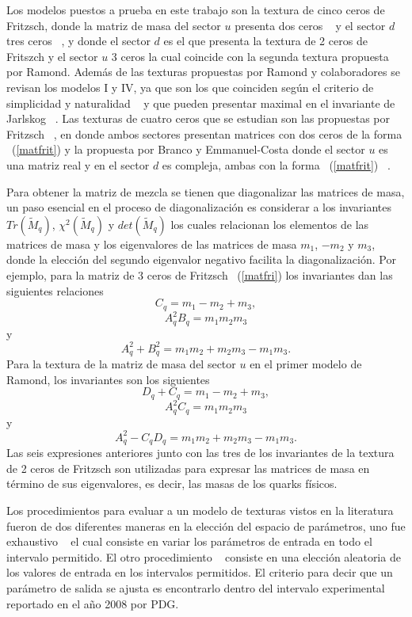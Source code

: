 
Los modelos puestos a prueba en este trabajo son la textura de cinco ceros de 
Fritzsch, donde la matriz de masa del sector $u$ presenta dos ceros 
~\cite{Mah200901} y el sector $d$ tres ceros ~\cite{Mah200901}, y donde el 
sector $d$ es el que presenta la textura de 2 ceros de Fritszch y el sector $u$ 3 ceros la cual coincide con la segunda
textura propuesta por Ramond. Adem\'as de las texturas propuestas por Ramond y 
colaboradores se revisan los modelos I y IV, ya que son los que coinciden 
seg\'un el criterio de simplicidad y naturalidad ~\cite{Fri200001} y que pueden 
presentar maximal en el invariante de Jarlskog ~\cite{Rod200101}. Las texturas 
de cuatro ceros que se estudian son las propuestas por Fritzsch 
~\cite{Fri200201}, en donde ambos sectores presentan matrices con dos ceros de 
la forma ~(\ref{matfrit}) y la propuesta por Branco y Emmanuel-Costa donde el 
sector $u$ es una matriz real y en el sector $d$ es compleja, ambas con la forma
~(\ref{matfrit}) ~\cite{Bra199902}. 

Para obtener la matriz de mezcla se tienen que diagonalizar las matrices de 
masa, un paso esencial en el proceso de diagonalizaci\'on es considerar a los 
invariantes $Tr(\tilde M_q)$, $\chi^2(\tilde M_q)$ y $det(\tilde M_q)$ los 
cuales relacionan los elementos de las matrices de masa y los eigenvalores de 
las matrices de masa $m_1$, $-m_2$ y $m_3$, donde la elecci\'on del segundo 
eigenvalor negativo facilita la diagonalizaci\'on. Por ejemplo, para la matriz 
de 3 ceros de Fritzsch ~(\ref{matfri}) los invariantes dan las siguientes 
relaciones
$$ C_q=m_1-m_2+m_3, $$
$$ A^2_qB_q=m_1m_2m_3 $$
y 
$$ A^2_q+B^2_q=m_1m_2+m_2m_3-m_1m_3.$$
Para la textura de la matriz de masa del sector $u$ en el primer modelo de 
Ramond, los invariantes son los siguientes
$$D_q+C_q=m_1-m_2+m_3,$$
$$ A^2_qC_q=m_1m_2m_3$$
y
$$A^2_q-C_qD_q=m_1m_2+m_2m_3-m_1m_3.$$
Las seis expresiones anteriores junto con las tres de los invariantes de la 
textura de 2 ceros de Fritzsch son utilizadas para expresar las matrices de masa
en t\'ermino de sus eigenvalores, es decir, las masas de los quarks f\'isicos. 

Los procedimientos para evaluar a un modelo de texturas vistos en la literatura 
fueron de dos diferentes maneras en la elecci\'on del espacio de par\'ametros, 
uno fue exhaustivo ~\cite{Mah200901} el cual consiste en variar los par\'ametros
de entrada en todo el intervalo permitido. El otro procedimiento
~\cite{Emm200901} consiste en una elecci\'on aleatoria de los valores de entrada
en los intervalos permitidos. El criterio para decir que un par\'ametro de
salida se ajusta es encontrarlo dentro del intervalo experimental reportado en
el a\~no 2008 por PDG.

